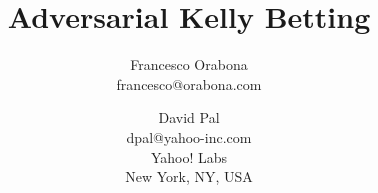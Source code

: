 \documentclass{article} %
\begin{document}
\nobibliography*

\title{Adversarial Kelly Betting}
\author{Francesco Orabona \\ francesco@orabona.com
\and David Pal \\ dpal@yahoo-inc.com\\
Yahoo! Labs\\New York, NY, USA}


\maketitle



\begin{abstract}%

\end{abstract}










\end{document}
